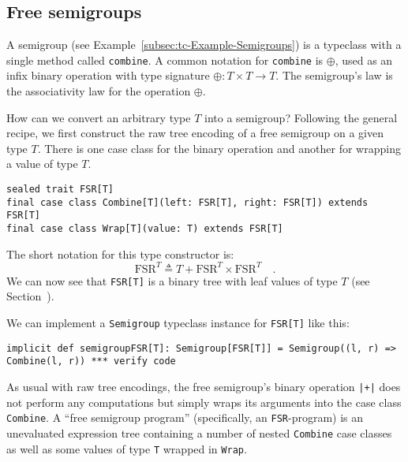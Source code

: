 \subsection{Free semigroups}

A semigroup (see Example~\ref{subsec:tc-Example-Semigroups}) is
a typeclass with a single method called \lstinline!combine!.
A common notation for \lstinline!combine!
is $\oplus$, used as an infix binary operation with type signature
$\oplus:T\times T\rightarrow T$. The semigroup\textsf{'}s law is the associativity
law for the operation $\oplus$.

How can we convert an arbitrary type $T$ into a semigroup? Following
the general recipe, we first construct the raw tree encoding of a
free semigroup on a given type $T$. There is one case class for the
binary operation and another for wrapping a value of type $T$.
\begin{lstlisting}
sealed trait FSR[T]
final case class Combine[T](left: FSR[T], right: FSR[T]) extends FSR[T]
final case class Wrap[T](value: T) extends FSR[T]
\end{lstlisting}
The short notation for this type constructor is:
\[
\text{FSR}^{T}\triangleq T+\text{FSR}^{T}\times\text{FSR}^{T}\quad.
\]
We can now see that \lstinline!FSR[T]!
is a binary tree with leaf values of type $T$ (see Section~).

We can implement a \lstinline!Semigroup!
typeclass instance for \lstinline!FSR[T]!
like this:
\begin{lstlisting}
implicit def semigroupFSR[T]: Semigroup[FSR[T]] = Semigroup((l, r) => Combine(l, r)) *** verify code
\end{lstlisting}
As usual with raw tree encodings, the free semigroup\textsf{'}s binary operation
\lstinline!|+|! does not
perform any computations but simply wraps its arguments into the case
class \lstinline!Combine!.
A \textsf{``}free semigroup program\textsf{''} (specifically, an \lstinline!FSR!-program)
is an unevaluated expression tree containing a number of nested \lstinline!Combine!
case classes as well as some values of type \lstinline!T!
wrapped in \lstinline!Wrap!. 

